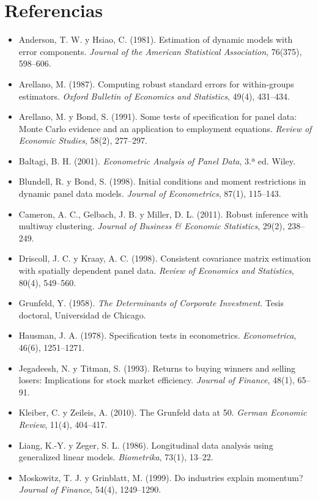 \section*{Referencias}
\begin{itemize}[leftmargin=*]
  \item Anderson, T. W. y Hsiao, C. (1981). Estimation of dynamic models with error components. \emph{Journal of the American
        Statistical Association}, 76(375), 598--606.
  \item Arellano, M. (1987). Computing robust standard errors for within-groups estimators. \emph{Oxford Bulletin of Economics and
        Statistics}, 49(4), 431--434.
  \item Arellano, M. y Bond, S. (1991). Some tests of specification for panel data: Monte Carlo evidence and an application to
        employment equations. \emph{Review of Economic Studies}, 58(2), 277--297.
  \item Baltagi, B. H. (2001). \emph{Econometric Analysis of Panel Data}, 3.ª ed. Wiley.
  \item Blundell, R. y Bond, S. (1998). Initial conditions and moment restrictions in dynamic panel data models. \emph{Journal of
        Econometrics}, 87(1), 115--143.
  \item Cameron, A. C., Gelbach, J. B. y Miller, D. L. (2011). Robust inference with multiway clustering. \emph{Journal of
        Business \& Economic Statistics}, 29(2), 238--249.
  \item Driscoll, J. C. y Kraay, A. C. (1998). Consistent covariance matrix estimation with spatially dependent panel data.
        \emph{Review of Economics and Statistics}, 80(4), 549--560.
  \item Grunfeld, Y. (1958). \emph{The Determinants of Corporate Investment}. Tesis doctoral, Universidad de Chicago.
  \item Hausman, J. A. (1978). Specification tests in econometrics. \emph{Econometrica}, 46(6), 1251--1271.
  \item Jegadeesh, N. y Titman, S. (1993). Returns to buying winners and selling losers: Implications for stock market
        efficiency. \emph{Journal of Finance}, 48(1), 65--91.
  \item Kleiber, C. y Zeileis, A. (2010). The Grunfeld data at 50. \emph{German Economic Review}, 11(4), 404--417.
  \item Liang, K.-Y. y Zeger, S. L. (1986). Longitudinal data analysis using generalized linear models. \emph{Biometrika}, 73(1),
        13--22.
  \item Moskowitz, T. J. y Grinblatt, M. (1999). Do industries explain momentum? \emph{Journal of Finance}, 54(4), 1249--1290.

\end{itemize}
